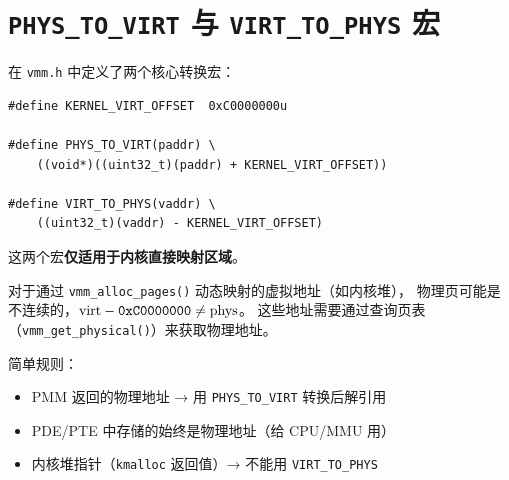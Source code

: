 \section{\texttt{PHYS\_TO\_VIRT} 与 \texttt{VIRT\_TO\_PHYS} 宏}

在 \texttt{vmm.h} 中定义了两个核心转换宏：

\begin{lstlisting}[style=cstyle, caption={地址转换宏（vmm.h）}]
#define KERNEL_VIRT_OFFSET  0xC0000000u

#define PHYS_TO_VIRT(paddr) \
    ((void*)((uint32_t)(paddr) + KERNEL_VIRT_OFFSET))

#define VIRT_TO_PHYS(vaddr) \
    ((uint32_t)(vaddr) - KERNEL_VIRT_OFFSET)
\end{lstlisting}

\begin{whybox}[title={作用域限制}]
这两个宏\textbf{仅适用于内核直接映射区域}。

对于通过 \texttt{vmm\_alloc\_pages()} 动态映射的虚拟地址（如内核堆），
物理页可能是不连续的，$\text{virt} - \texttt{0xC0000000} \neq \text{phys}$。
这些地址需要通过查询页表（\texttt{vmm\_get\_physical()}）来获取物理地址。

简单规则：
\begin{itemize}
  \item PMM 返回的物理地址 → 用 \texttt{PHYS\_TO\_VIRT} 转换后解引用
  \item PDE/PTE 中存储的始终是物理地址（给 CPU/MMU 用）
  \item 内核堆指针（\texttt{kmalloc} 返回值）→ 不能用 \texttt{VIRT\_TO\_PHYS}
\end{itemize}
\end{whybox}


